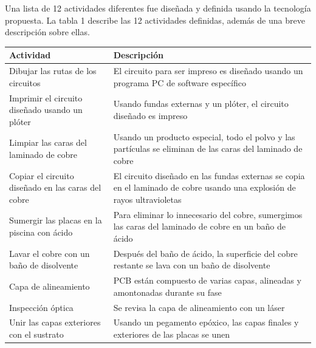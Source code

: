 \documentclass{article}
\begin{document}
Una lista de 12 actividades diferentes fue diseñada y definida usando la tecnología propuesta. La tabla 1 describe las 12 actividades definidas, además de una breve descripción sobre ellas.

\begin{table}[h]
	\begin{center}
		\begin{tabular}{ | p{4cm} | p{9cm} | }
			\hline Actividad                                   & Descripción                                                                                                              \\ \hline
			Dibujar las rutas de los circuitos                 & El circuito para ser impreso es diseñado usando un programa PC de software específico                                    \\ \hline
Imprimir el circuito diseñado usando un plóter     & Usando fundas externas y un plóter, el circuito diseñado es impreso                                                      \\ \hline
Limpiar las caras del laminado de cobre            & Usando un producto especial, todo el polvo y las partículas se eliminan de las caras del laminado de cobre               \\ \hline
			Copiar el circuito diseñado en las caras del cobre & El circuito diseñado en las fundas externas se copia en el laminado de cobre usando una explosión de rayos ultravioletas \\ \hline
			Sumergir las placas en la piscina con ácido        & Para eliminar lo innecesario del cobre, sumergimos las caras del laminado de cobre en un baño de ácido                   \\ \hline
			Lavar el cobre con un baño de disolvente           & Después del baño de ácido, la superficie del cobre restante se lava con un baño de disolvente                            \\ \hline
			Capa de alineamiento                               & PCB están compuesto de varias capas, alineadas y amontonadas durante su fase                                             \\ \hline
			Inspección óptica                                  & Se revisa la capa de alineamiento con un láser                                                                           \\ \hline
			Unir las capas exteriores con el sustrato          & Usando un pegamento epóxico, las capas finales y exteriores de las placas se unen                                        \\ \hline

\end{tabular}
\end{center}
\end{table}
\end{document}
